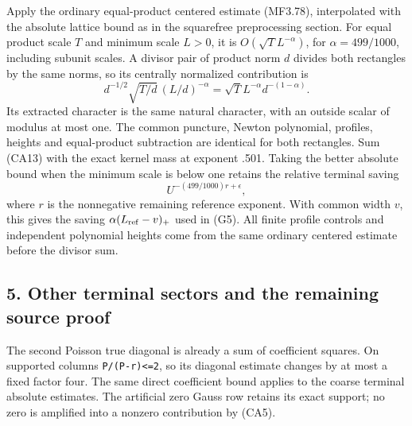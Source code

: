 Apply the ordinary equal-product centered estimate (MF3.78), interpolated with the absolute lattice bound as in the squarefree preprocessing section. For equal product scale \(T\) and minimum scale \(L>0\), it is \(O(\sqrt T L^{-\alpha})\), for \(\alpha=499/1000\), including subunit scales. A divisor pair of product norm \(d\) divides both rectangles by the same norms, so its centrally normalized contribution is \[
 d^{-1/2}\sqrt{T/d}\,(L/d)^{-\alpha}
   =\sqrt T L^{-\alpha}d^{-(1-\alpha)}.
 \tag{CA13}
\] Its extracted character is the same natural character, with an outside scalar of modulus at most one. The common puncture, Newton polynomial, profiles, heights and equal-product subtraction are identical for both rectangles. Sum (CA13) with the exact kernel mass at exponent .501. Taking the better absolute bound when the minimum scale is below one retains the relative terminal saving \[
 U^{-(499/1000)r+\epsilon},\tag{CA14}
\] where \(r\) is the nonnegative remaining reference exponent. With common width \(v\), this gives the saving \(\alpha(L_{\rm ref}-v)_+\) used in (G5). All finite profile controls and independent polynomial heights come from the same ordinary centered estimate before the divisor sum.

\hypertarget{sources:other-terminal-sectors-and-the-remaining-source-proof}{%
\subsection{5. Other terminal sectors and the remaining source proof}\label{sources:other-terminal-sectors-and-the-remaining-source-proof}}

The second Poisson true diagonal is already a sum of coefficient squares. On supported columns \texttt{P/(P-r)\textless{}=2}, so its diagonal estimate changes by at most a fixed factor four. The same direct coefficient bound applies to the coarse terminal absolute estimates. The artificial zero Gauss row retains its exact support; no zero is amplified into a nonzero contribution by (CA5).

